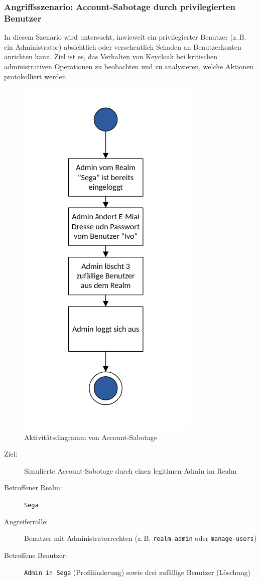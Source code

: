 \documentclass[a4paper,12pt]{article}
\begin{document}
	\subsubsection{Angriffsszenario: Account-Sabotage durch privilegierten Benutzer}
	In diesem Szenario wird untersucht, inwieweit ein privilegierter Benutzer (z.\,B. ein Administrator) absichtlich oder versehentlich Schaden an Benutzerkonten anrichten kann. Ziel ist es, das Verhalten von Keycloak bei kritischen administrativen Operationen zu beobachten und zu analysieren, welche Aktionen protokolliert werden.
	
	\begin{figure}
		\centering
		\includegraphics[width=0.5\linewidth]{Bilder/acc_sab_ad}
		\caption{Aktivitätsdiagramm von Account-Sabotage}
		\label{fig:accsabad}
	\end{figure}
	
	
	\begin{description}
		\item[Ziel:] Simulierte Account-Sabotage durch einen legitimen Admin im Realm
		\item[Betroffener Realm:] \texttt{Sega}
		\item[Angreiferrolle:] Benutzer mit Administratorrechten (z.\,B. \texttt{realm-admin} oder \texttt{manage-users})
		\item[Betroffene Benutzer:] \texttt{Admin in Sega} (Profiländerung) sowie drei zufällige Benutzer (Löschung)
	\end{description}
	
\end{document}
